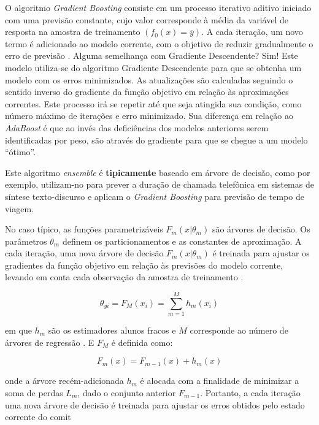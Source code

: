 \documentclass[
  openany]{book}
\begin{document}
O algoritmo \emph{Gradient Boosting} \citep{friedman1999bump} consiste em um processo iterativo aditivo iniciado com uma previsão constante, cujo valor corresponde à média da variável de resposta na amostra de treinamento \((f_0(x)=\overline{y})\). A cada iteração, um novo termo é adicionado ao modelo corrente, com o objetivo de reduzir gradualmente o erro de previsão \citep{mayrink2015avaliaccao}. Alguma semelhança com Gradiente Descendente? Sim! Este modelo utiliza-se do algoritmo Gradiente Descendente para que se obtenha um modelo com os erros minimizados. As atualizações são calculadas seguindo o sentido inverso do gradiente da função objetivo em relação às aproximações correntes. Este processo irá se repetir até que seja atingida sua condição, como número máximo de iterações e erro minimizado. Sua diferença em relação ao \emph{AdaBoost} é que ao invés das deficiências dos modelos anteriores serem identificadas por peso, são através do gradiente para que se chegue a um modelo ``ótimo''.

Este algoritmo \emph{ensemble} é \textbf{tipicamente} baseado em árvore de decisão, como por exemplo, \citet{yamagishi2008phone} utilizam-no para prever a duração de chamada telefônica em sistemas de síntese texto-discurso e \citet{zhang2015gradient} aplicam o \emph{Gradient Boosting} para previsão de tempo de viagem.

No caso típico, as funções parametrizáveis \(F_m(x|\theta_m)\) são árvores de decisão. Os parâmetros \(\theta_m\) definem os particionamentos e as constantes de aproximação. A cada iteração, uma nova árvore de decisão \(F_m(x|\theta_m)\) é treinada para ajustar os gradientes da função objetivo em relação às previsões do modelo corrente, levando em conta cada observação da amostra de treinamento \citep{freitas2020}.

\begin{equation}
   \theta_{yi}=F_M(x_i)=\displaystyle \sum^M_{m=1}h_m(x_i)
    \label{eq:gdboostarvore}
\end{equation}

em que \(h_m\) são os estimadores alunos fracos e \(M\) corresponde ao número de árvores de regressão \citep{ke2017lightgbm}.
E \(F_M\) é definida como:

\begin{equation}
   F_m(x)=F_{m-1}(x)+h_m(x)
    \label{eq:gdboostarvore2}
\end{equation}

onde a árvore recém-adicionada \(h_m\) é alocada com a finalidade de minimizar a soma de perdas \(L_m\), dado o conjunto anterior \(F_{m-1}\). Portanto, a cada iteração uma nova árvore de decisão é treinada para ajustar os erros
obtidos pelo estado corrente do comit
\end{document}
